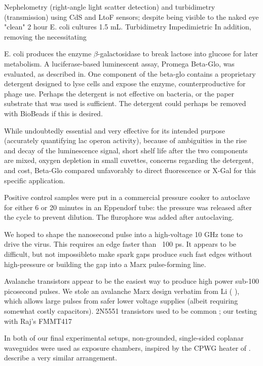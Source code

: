 \documentclass[paper.tex]{subfiles}
\begin{document}
\begin{multicols}{1}
Nephelometry (right-angle light scatter detection) and turbidimetry (transmission) using CdS and LtoF sensors; despite being visible to the naked eye "clean" 2 hour E. coli cultures 1.5 mL. Turbidimetry\cite{Fast2019} Impedimietric In addition, removing the necessitating 

E. coli produces the enzyme $\beta$-galactosidase to break lactose into glucose for later metabolism. A luciferase-based luminescent assay, Promega Beta-Glo, was evaluated, as described in\cite{rapid2014}. One component of the beta-glo contains a proprietary detergent designed to lyse cells\cite{BETAGLO2003} and expose the enzyme, counterproductive for phage use. Perhaps the detergent is not effective on bacteria, or the paper substrate that was used is sufficient. The detergent could perhaps be removed with BioBeads if this is desired.
 
While undoubtedly essential and very effective for its intended purpose (accurately quantifying lac operon activity), because of ambiguities in the rise and decay of the luminescence signal, short shelf life after the two components are mixed, oxygen depletion in small cuvettes, concerns regarding the detergent, and cost, Beta-Glo compared unfavorably to direct fluorescence or X-Gal for this specific application.

Positive control samples were put in a commercial pressure cooker to autoclave for either 6 or 20 minutes in an Eppendorf tube: the pressure was released after the cycle to prevent dilution. The flurophore was added after autoclaving.

We hoped to shape the nanosecond pulse into a high-voltage 10 GHz tone to drive the virus. This requires an edge faster than ~100 ps. It appears to be difficult, but not impossible\cite{Fundamental1998}to make spark gaps produce such fast edges without high-pressure\cite{kHz1995} \cite{Design2007d}\cite{Picosecond1993} or building the gap into a Marx\cite{Simple1991} pulse-forming line. 

Avalanche transistors appear to be the easiest way to produce high power sub-100 picosecond pulses. We stole an avalanche Marx design verbatim from Li (\cite{Development2016b} \cite{Design2018c}), which allows large pulses from safer lower voltage supplies (albeit requiring somewhat costly capacitors). 2N5551 transistors used to be common \cite{Avalanche1991}\cite{high1994}\cite{High1998}; our testing with Raj's FMMT417

In both of our final experimental setups, non-grounded, single-sided coplanar waveguides were used as exposure chambers, inspired by the CPWG heater of \cite{Microwave2007}. \cite{Nanosecond2006} describe a very similar arrangement. 


\end{multicols}
\end{document}
